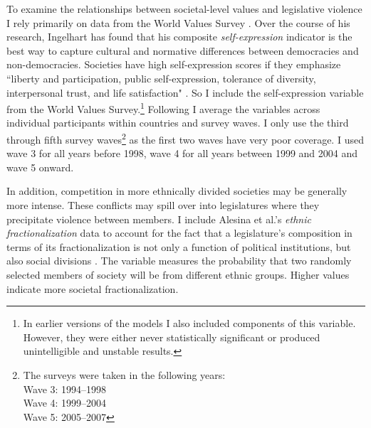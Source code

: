 \documentclass[a4paper]{article}\usepackage[]{graphicx}\usepackage[]{color}
\begin{document}
To examine the relationships between societal-level values and legislative violence I rely primarily on data from the World Values Survey \citeyearpar{WVS2009}. Over the course of his research, Ingelhart has found that his composite {\emph{self-expression}} indicator is the best way to capture cultural and normative differences between democracies and non-democracies. Societies have high self-expression scores if they emphasize ``liberty and participation, public self-expression, tolerance of diversity, interpersonal trust, and life satisfaction" \citep[64]{Inglehart2003}. So I include the self-expression variable from the World Values Survey.\footnote{In earlier versions of the models I also included components of this variable. However, they were either never statistically significant or produced unintelligible and unstable results.} Following \cite{Inglehart2003} I average the variables across individual participants within countries and survey waves. I only use the third through fifth survey waves\footnote{The surveys were taken in the following years: \\ Wave 3: 1994--1998 \\ Wave 4: 1999--2004 \\ Wave 5: 2005--2007} as the first two waves have very poor coverage. I used wave 3 for all years before 1998, wave 4 for all years between 1999 and 2004 and wave 5 onward.

In addition, competition in more ethnically divided societies may be generally more intense. These conflicts may spill over into legislatures where they precipitate violence between members. I include Alesina et al.'s \citeyearpar{Alesina2003} {\emph{ethnic fractionalization}} data to account for the fact that a legislature's composition in terms of its fractionalization is not only a function of political institutions, but also social divisions \citep{Neto1997, Mozaffar2003}. The variable measures the probability that two randomly selected members of society will be from different ethnic groups. Higher values indicate more societal fractionalization.


\end{document}
